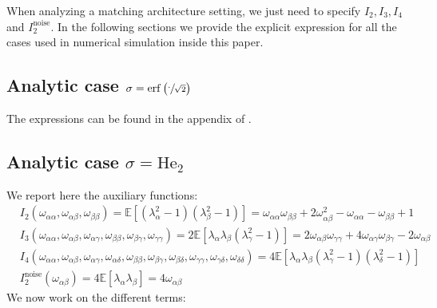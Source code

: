 When analyzing a matching architecture setting, we just need to specify \(I_2,I_3,I_4\) and \(I^\text{noise}_2\). In the following sections we provide the explicit expression for all the cases used in numerical simulation inside this paper.

\subsection{Analytic case \texorpdfstring{$\sigma =\operatorname{erf}\left(\sfrac{\cdot}{\sqrt{2}}\right)$}{sigma = erf(./sqrt(2))}}
The expressions can be found in the appendix of \cite{veiga2022phase}.

\subsection{Analytic case \texorpdfstring{$\sigma =\text{He}_2$}{sigma = He2}}
\label{2406:sec:app:H2_theory}
We report here the auxiliary functions: 
\begin{align*}
&I_2(\omega_{\alpha\alpha},\omega_{\alpha\beta},\omega_{\beta\beta}) = \mathbb E\left[(\lambda_\alpha^2-1)(\lambda_\beta^2-1)\right] = \omega_{\alpha\alpha} \omega_{\beta\beta} + 2 \omega_{\alpha\beta}^2 - \omega_{\alpha\alpha} - \omega_{\beta\beta} + 1 \\
&I_3(\omega_{\alpha\alpha},\omega_{\alpha\beta}, \omega_{\alpha\gamma},\omega_{\beta\beta}, \omega_{\beta\gamma},\omega_{\gamma\gamma}) = 2\mathbb E \left[\lambda_\alpha\lambda_\beta(\lambda^2_\gamma-1)\right] = 2 \omega_{\alpha \beta} \omega_{\gamma \gamma}+4 \omega_{\alpha \gamma} \omega_{\beta \gamma} - 2\omega_{\alpha\beta} \\
 &I_4(
      \omega_{\alpha\alpha},
      \omega_{\alpha\beta},
      \omega_{\alpha\gamma},
      \omega_{\alpha\delta},
      \omega_{\beta\beta},
      \omega_{\beta\gamma},
      \omega_{\beta\delta},
      \omega_{\gamma\gamma},
      \omega_{\gamma\delta},
      \omega_{\delta\delta}
    ) = 4\mathbb E\left[\lambda_\alpha\lambda_\beta(\lambda^2_\gamma-1)(\lambda^2_\delta-1)\right]
    \\
&I^\text{noise}_2(\omega_{\alpha\beta}) = 4 \mathbb E \left[\lambda_\alpha\lambda_\beta\right] = 4 \omega_{\alpha \beta}
\end{align*}
We now work on the different terms: 
